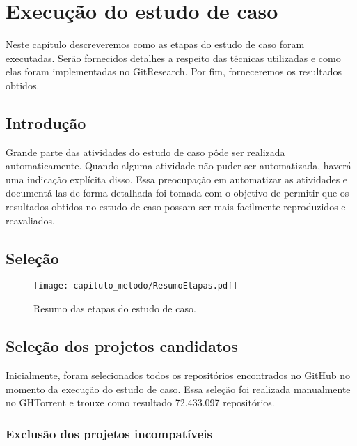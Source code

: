 \chapter{Execução do estudo de caso}
\label{cap_estudo_caso_execucao}

Neste capítulo descreveremos como as etapas do estudo de caso foram executadas. Serão fornecidos detalhes a respeito das técnicas utilizadas e como elas foram implementadas no GitResearch.  Por fim, forneceremos os resultados obtidos.

\section{Introdução}

Grande parte das atividades do estudo de caso pôde ser realizada automaticamente. Quando alguma atividade não puder ser automatizada, haverá uma indicação explícita disso. Essa preocupação em automatizar as atividades e documentá-las de forma detalhada foi tomada com o objetivo de permitir que os resultados obtidos no estudo de caso possam ser mais facilmente reproduzidos e reavaliados. 



\section{Seleção}
\label{secao_cap_estudo_selecao_projetos}


  \begin{figure}[H]
  \centering
  \texttt{[image: capitulo\_metodo/ResumoEtapas.pdf]} 
  \caption{Resumo das etapas do estudo de caso. }
  \label{fig:cap_metodo_resumo_etapas_selecao} 
\end{figure}

\section{Seleção dos projetos candidatos}

Inicialmente, foram selecionados todos os repositórios encontrados no GitHub no momento da execução do estudo de caso.  Essa seleção foi realizada manualmente no GHTorrent  e trouxe como resultado 72.433.097  repositórios. 

\subsection{Exclusão dos projetos incompatíveis}


